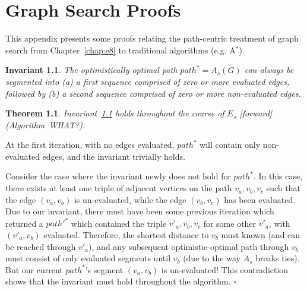 \documentclass{report}
\newtheorem{invariant}{Invariant}
\newtheorem{theorem}{Theorem}
\newenvironment{proof}[1][Proof]{\begin{trivlist}
   \item[\hskip \labelsep {\bfseries #1}]}{\hfill$\square$\end{trivlist}}
\begin{document}
{\small


}

\appendix
\chapter{Graph Search Proofs}
\label{appendix:gs-proofs}

This appendix presents some proofs relating the path-centric treatment
of graph search from Chapter~\ref{chap:e8}
to traditional algorithms (e.g. A$^*$).

\begin{invariant}
The optimistically optimal path $path^* = A_s(G)$ can always be
segmented into
(a) a first sequence comprised of zero or more evaluated edges,
followed by
(b) a second sequence comprised of zero or more non-evaluated edges.
\label{inv:path-segmentation}
\end{invariant}

\begin{theorem}
Invariant~\ref{inv:path-segmentation} holds throughout the course of
$E_s$ [forward] (Algorithm~WHAT?).
\label{thm:seg-fwd}
\end{theorem}

\begin{proof}
At the first iteration, with no edges evaluated,
$path^*$ will contain only non-evaluated edges,
and the invariant trivially holds.

Consider the case where the invariant newly does not hold for $path^*$.
In this case, there exists at least one triple of adjacent vertices
on the path $v_a, v_b, v_c$
such that the edge $(v_a, v_b)$ is un-evaluated,
while the edge $(v_b, v_c)$ has been evaluated.
Due to our invariant,
there must have been some previous iteration which returned a
$path'^*$ which contained the triple
$v'_a, v_b, v_c$ for some other $v'_a$,
with $(v'_a, v_b)$ evaluated.
Therefore, the shortest distance to $v_b$ must known (and can be
reached through $v'_a$),
and any subsequent optimistic-optimal path through $v_b$
must consist of only evaluated segments until $v_b$
(due to the way $A_s$ breaks ties).
But our current $path^*$'s segment $(v_a, v_b)$ is un-evaluated!
This contradiction shows that the invariant must hold throughout the
algorithm.
\end{proof}
\end{document}
